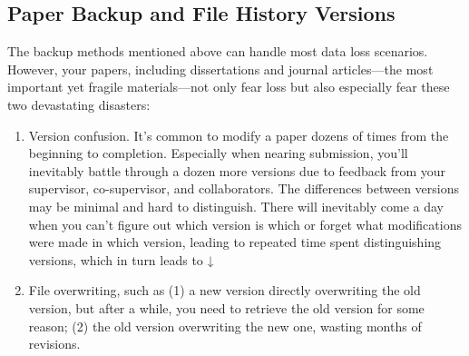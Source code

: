 \subsection{Paper Backup and File History Versions}
\begin{minipage}[t]{0.65\textwidth}
    The backup methods mentioned above can handle most data loss scenarios. However, your papers, including dissertations and journal articles—the most important yet fragile materials—not only fear loss but also especially fear these two devastating disasters:
    \begin{enumerate}
        \item Version confusion. It's common to modify a paper dozens of times from the beginning to completion. Especially when nearing submission, you'll inevitably battle through a dozen more versions due to feedback from your supervisor, co-supervisor, and collaborators. The differences between versions may be minimal and hard to distinguish. There will inevitably come a day when you can't figure out which version is which or forget what modifications were made in which version, leading to repeated time spent distinguishing versions, which in turn leads to ↓
        \item File overwriting, such as (1) a new version directly overwriting the old version, but after a while, you need to retrieve the old version for some reason; (2) the old version overwriting the new one, wasting months of revisions.
    \end{enumerate}
\end{minipage}
